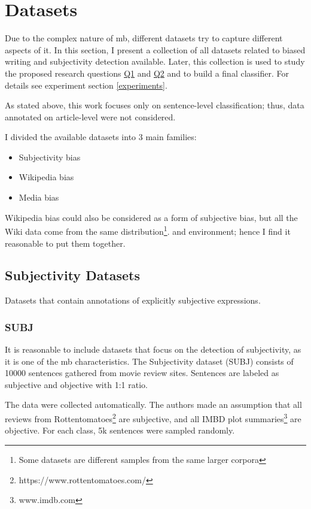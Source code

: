 \chapter{Datasets} \label{datasets}
Due to the complex nature of \gls{mb}, different datasets try to capture different aspects of it. In this section, I present a collection of all datasets related to biased writing and subjectivity detection available. Later, this collection is used to study the proposed research questions \hyperref[Q1]{Q1} and \hyperref[Q2]{Q2} and to build a final classifier. For details see experiment section \ref{experiments}.

As stated above, this work focuses only on sentence-level classification; thus, data annotated on article-level were not considered.

I divided the available datasets into 3 main families: 
\begin{itemize}
    \item Subjectivity bias
    \item Wikipedia bias
    \item Media bias
\end{itemize}
Wikipedia bias could also be considered as a form of subjective bias, but all the Wiki data come from the same distribution\footnote{Some datasets are different samples from the same larger corpora}. and environment; hence I find it reasonable to put them together.


\section{Subjectivity Datasets}
Datasets that contain annotations of explicitly subjective expressions.

\subsection{SUBJ}
It is reasonable to include datasets that focus on the detection of subjectivity, as it is one of the \gls{mb} characteristics. The Subjectivity dataset (SUBJ) \cite{Pang+Lee:04a} consists of 10000 sentences gathered from movie review sites. Sentences are labeled as subjective and objective with 1:1 ratio. 

The data were collected automatically. The authors made an assumption that all reviews from Rottentomatoes\footnote{https://www.rottentomatoes.com/} are subjective, and all IMBD plot summaries\footnote{ www.imdb.com} are objective. For each class, 5k sentences were sampled randomly.




